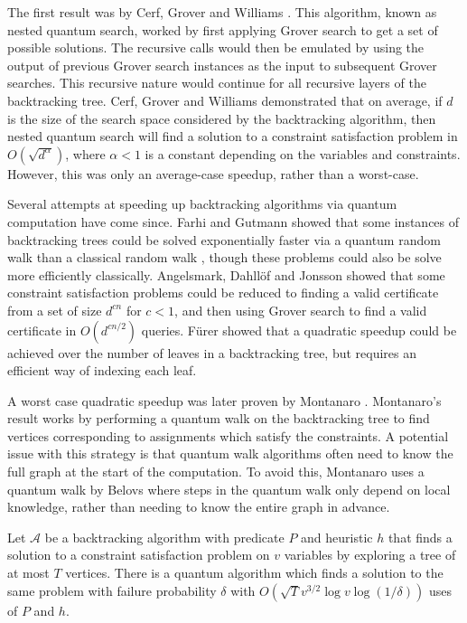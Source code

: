 The first result was by Cerf, Grover and Williams \cite{cerf2000}. This algorithm, known as nested quantum search, worked by first applying Grover search to get a set of possible solutions. The recursive calls would then be emulated by using the output of previous Grover search instances as the input to subsequent Grover searches. This recursive nature would continue for all recursive layers of the backtracking tree. Cerf, Grover and Williams demonstrated that on average, if $d$ is the size of the search space considered by the backtracking algorithm, then nested quantum search will find a solution to a constraint satisfaction problem in $O(\sqrt{d^\alpha})$, where $\alpha<1$ is a constant depending on the variables and constraints. However, this was only an average-case speedup, rather than a worst-case.

Several attempts at speeding up backtracking algorithms via quantum computation have come since. Farhi and Gutmann \cite{farhi1998} showed that some instances of backtracking trees could be solved exponentially faster via a quantum random walk than a classical random walk \cite{farhi1998}, though these problems could also be solve more efficiently classically. Angelsmark, Dahll{\"o}f and Jonsson showed that some constraint satisfaction problems could be reduced to finding a valid certificate from a set of size $d^{cn}$ for $c<1$, and then using Grover search to find a valid certificate in $O(d^{cn/2})$ queries. F\"{u}rer \cite{furer2008} showed that a quadratic speedup could be achieved over the number of leaves in a backtracking tree, but requires an efficient way of indexing each leaf.

A worst case quadratic speedup was later proven by Montanaro \cite{montanaro2015}. Montanaro's result works by performing a quantum walk on the backtracking tree to find vertices corresponding to assignments which satisfy the constraints. A potential issue with this strategy is that quantum walk algorithms often need to know the full graph at the start of the computation. To avoid this, Montanaro uses a quantum walk by Belovs \cite{belovs2013,belovs13a} where steps in the quantum walk only depend on local knowledge, rather than needing to know the entire graph in advance.

\begin{theorem}
\label{thm:backtrack}
Let $\mathcal{A}$ be a backtracking algorithm with predicate $P$ and heuristic $h$ that finds a solution to a constraint satisfaction problem on $v$ variables by exploring a tree of at most $T$ vertices. There is a quantum algorithm which finds a solution to the same problem with failure probability $\delta$ with $O(\sqrt{T}v^{3/2}\log v\log(1/\delta))$ uses of $P$ and $h$.
\end{theorem}

